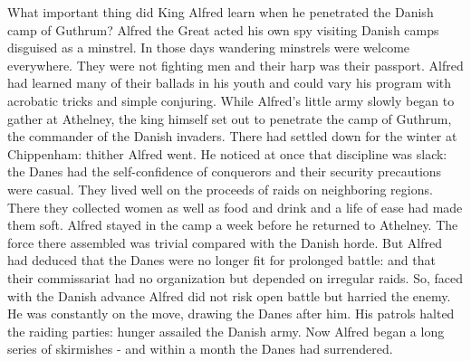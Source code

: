 \begin{enumerate}
What important thing did King Alfred learn when he penetrated the Danish camp of Guthrum? 
Alfred the Great acted his own spy visiting Danish camps disguised as a minstrel.
In those days wandering minstrels were welcome everywhere.
They were not fighting men and their harp was their passport.
Alfred had learned many of their ballads in his youth and could vary his program with acrobatic tricks and simple conjuring.
While Alfred's little army slowly began to gather at Athelney, the king himself set out to penetrate the camp of Guthrum, the commander of the Danish invaders.
There had settled down for the winter at Chippenham: thither Alfred went.
He noticed at once that discipline was slack: the Danes had the self-confidence of conquerors and their security precautions were casual.
They lived well on the proceeds of raids on neighboring regions.
There they collected women as well as food and drink and a life of ease had made them soft.
Alfred stayed in the camp a week before he returned to Athelney.
The force there assembled was trivial compared with the Danish horde.
But Alfred had deduced that the Danes were no longer fit for prolonged battle: and that their commissariat had no organization but depended on irregular raids.
So, faced with the Danish advance Alfred did not risk open battle but harried the enemy.
He was constantly on the move, drawing the Danes after him.
His patrols halted the raiding parties: hunger assailed the Danish army.
Now Alfred began a long series of skirmishes - and within a month the Danes had surrendered.



\end{enumerate}
